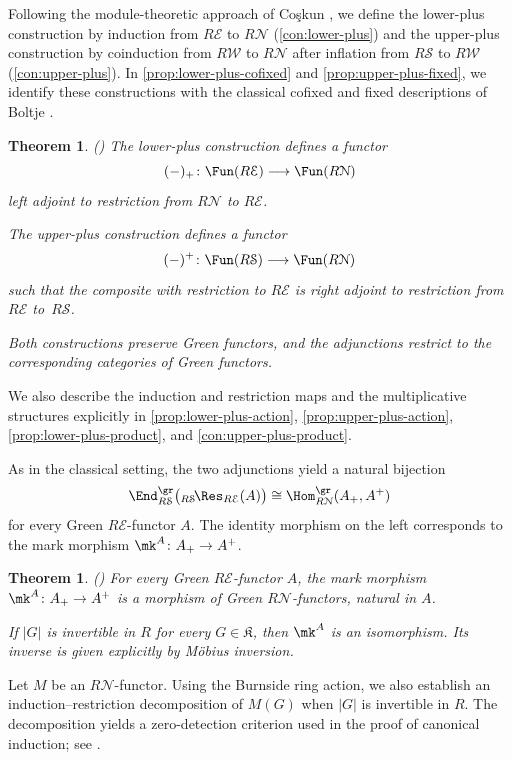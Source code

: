 \documentclass{amsart}
\numberwithin{equation}{section}%
\newtheorem{Thm}[equation]{Theorem}
\theoremstyle{remark}
\theoremstyle{definition}
\newcommand{\e}{\mathcal E}
\newcommand{\s}{\mathcal S}
\newcommand{\lRes}[1]{{}_{#1}\!\Res}
\begin{document}
Following the module-theoretic approach of Co\c{s}kun
\cite{Coskun07}, we define the lower-plus construction
by induction from $R\mathcal E$ to $R\mathcal N$ 
(\cref{con:lower-plus})
and the upper-plus construction by coinduction from
$R\mathcal W$ to $R\mathcal N$ after inflation from
$R\mathcal S$ to $R\mathcal W$ (\cref{con:upper-plus}).
In \cref{prop:lower-plus-cofixed} and \cref{prop:upper-plus-fixed}, 
we identify these constructions with the classical
cofixed and fixed descriptions of Boltje \cite{Boltje98a} .
%
\begin{Thm}()
\label{thm:intro-plus-constructions}
The lower-plus construction defines a functor
\[
(-)_+\colon
\Fun(R\mathcal E)\longrightarrow\Fun(R\mathcal N)
\]
left adjoint to restriction from $R\mathcal N$ to
$R\mathcal E$.

The upper-plus construction defines a functor
\[
(-)^+\colon
\Fun(R\mathcal S)\longrightarrow\Fun(R\mathcal N)
\]
such that the composite with restriction to
$R\mathcal E$ is right adjoint to restriction from
$R\mathcal E$ to~$R\mathcal S$.

Both constructions preserve Green functors, and the
adjunctions restrict to the corresponding categories
of Green functors.
\end{Thm}
%
We also describe the induction and restriction maps and
the multiplicative structures explicitly in \cref{prop:lower-plus-action}, 
\cref{prop:upper-plus-action}, \cref{prop:lower-plus-product}, and 
\cref{con:upper-plus-product}.


As in the classical setting, the two adjunctions yield
a natural bijection
%
\[
\End^\gr_{R\mathcal S}
\bigl(\lRes{R\s}_{R\e}(A)
\bigr)
\cong
\Hom^\gr_{R\mathcal N}(A_+,A^+)
\]
%
for every Green $R\mathcal E$-functor $A$. The identity morphism
on the left corresponds to the mark morphism
$\mk^A\colon A_+\to A^+$.
%
\begin{Thm}()
\label{thm:intro-mark-map}
For every Green $R\mathcal E$-functor $A$, the mark morphism
$\mk^A\colon A_+\to A^+$ is a morphism of Green
$R\mathcal N$-functors, natural in $A$.

If $|G|$ is invertible in $R$ for every
$G\in\mathfrak K$, then $\mk^A$ is an isomorphism.
Its inverse is given explicitly by M\"obius inversion.
\end{Thm}
%
Let $M$ be an $R\mathcal N$-functor. Using the Burnside ring action, 
we also establish an
induction--restriction decomposition of $M(G)$ when
$|G|$ is invertible in $R$. The decomposition yields a
zero-detection criterion used in the proof of canonical
induction; see
.
\end{document}
